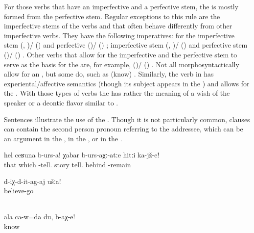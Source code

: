 For those verbs that have an imperfective and a perfective stem, the  is mostly formed from the perfective stem. Regular exceptions to this rule are the imperfective stems of the verbs  and  that often behave differently from other imperfective verbs. They have the following imperatives: for the imperfective stem  (, )\slash{} ()  and perfective  ()\slash{} () ; imperfective stem  (, )\slash{} ()  and perfective stem  ()\slash{} () . Other verbs that allow for the imperfective and the perfective stem to serve as the basis for the  are, for example,  ()\slash{} () . Not all morphosyntactically  allow for an , but some do, such as  (know) . Similarly, the verb in  has experiental\slash affective semantics (though its subject appears in the ) and allows for the . With those types of verbs the  has rather the meaning of a wish of the speaker or a deontic flavor similar to .

Sentences  illustrate the use of the . Though it is not particularly common,  clauses can contain the second person pronoun referring to the addressee, which can be an argument in the  , in the  , or in the .
%
\begin{exe}
	\ex	\label{ex:‎Tell it like this}
	\gll	hel	ceʁuna	b-urs-a!	χabar		b-urs-aχː-atːe	hitːi	ka-jž-e!\\
		that	which	-tell.	story	tell.	behind	-remain\\
	\glt	{}

	\ex	\label{ex:You pl believe me}
	\gll	d-iχ-d-it-ag-aj	ušːa!\\
		believe-go	\\
		\\
	\glt	{}

	\ex	\label{ex:I am yours, (you) know}
	\gll	ala	ca-w=da	du,	b-aχ-e!\\
					know\\
	\glt	{}
\end{exe}

